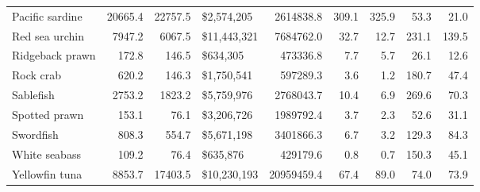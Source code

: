 \documentclass[
  letterpaper,
  DIV=11,
  numbers=noendperiod]{scrartcl}
\begin{document}
\begin{longtable}[t]{lrrlrrrrr}
\addlinespace
Pacific sardine & 20665.4 & 22757.5 & \$2,574,205 & 2614838.8 & 309.1 & 325.9 & 53.3 & 21.0\\
Red sea urchin & 7947.2 & 6067.5 & \$11,443,321 & 7684762.0 & 32.7 & 12.7 & 231.1 & 139.5\\
Ridgeback prawn & 172.8 & 146.5 & \$634,305 & 473336.8 & 7.7 & 5.7 & 26.1 & 12.6\\
Rock crab & 620.2 & 146.3 & \$1,750,541 & 597289.3 & 3.6 & 1.2 & 180.7 & 47.4\\
Sablefish & 2753.2 & 1823.2 & \$5,759,976 & 2768043.7 & 10.4 & 6.9 & 269.6 & 70.3\\
\addlinespace
Spotted prawn & 153.1 & 76.1 & \$3,206,726 & 1989792.4 & 3.7 & 2.3 & 52.6 & 31.1\\
Swordfish & 808.3 & 554.7 & \$5,671,198 & 3401866.3 & 6.7 & 3.2 & 129.3 & 84.3\\
White seabass & 109.2 & 76.4 & \$635,876 & 429179.6 & 0.8 & 0.7 & 150.3 & 45.1\\
Yellowfin tuna & 8853.7 & 17403.5 & \$10,230,193 & 20959459.4 & 67.4 & 89.0 & 74.0 & 73.9\\
\bottomrule
\end{longtable}
\endgroup{}
\end{document}
